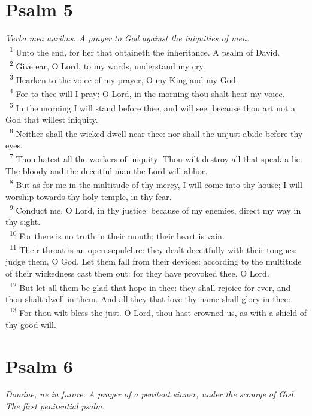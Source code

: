 \documentclass[a5paper,12pt]{article}
\begin{document}
\begin{multicols*}{2}
\section{Psalm 5}
\label{sec:org58962b2}
\emph{Verba mea auribus. A prayer to God against the iniquities of men.}\\

~\textsuperscript{1} Unto the end, for her that obtaineth the inheritance. A psalm of David.\\
~\textsuperscript{2} Give ear, O Lord, to my words, understand my cry.\\
~\textsuperscript{3} Hearken to the voice of my prayer, O my King and my God.\\
~\textsuperscript{4} For to thee will I pray: O Lord, in the morning thou shalt hear my voice.\\
~\textsuperscript{5} In the morning I will stand before thee, and will see: because thou art not a God that willest iniquity.\\
~\textsuperscript{6} Neither shall the wicked dwell near thee: nor shall the unjust abide before thy eyes.\\
~\textsuperscript{7} Thou hatest all the workers of iniquity: Thou wilt destroy all that speak a lie. The bloody and the deceitful man the Lord will abhor.\\
~\textsuperscript{8} But as for me in the multitude of thy mercy, I will come into thy house; I will worship towards thy holy temple, in thy fear.\\
~\textsuperscript{9} Conduct me, O Lord, in thy justice: because of my enemies, direct my way in thy sight.\\
~\textsuperscript{10} For there is no truth in their mouth; their heart is vain.\\
~\textsuperscript{11} Their throat is an open sepulchre: they dealt deceitfully with their tongues: judge them, O God. Let them fall from their devices: according to the multitude of their wickedness cast them out: for they have provoked thee, O Lord.\\
~\textsuperscript{12} But let all them be glad that hope in thee: they shall rejoice for ever, and thou shalt dwell in them. And all they that love thy name shall glory in thee:\\
~\textsuperscript{13} For thou wilt bless the just. O Lord, thou hast crowned us, as with a shield of thy good will.\\

\section{Psalm 6}
\label{sec:org348bf74}
\emph{Domine, ne in furore. A prayer of a penitent sinner, under the scourge of God. The first penitential psalm.}\\


\end{multicols*}
\end{document}
